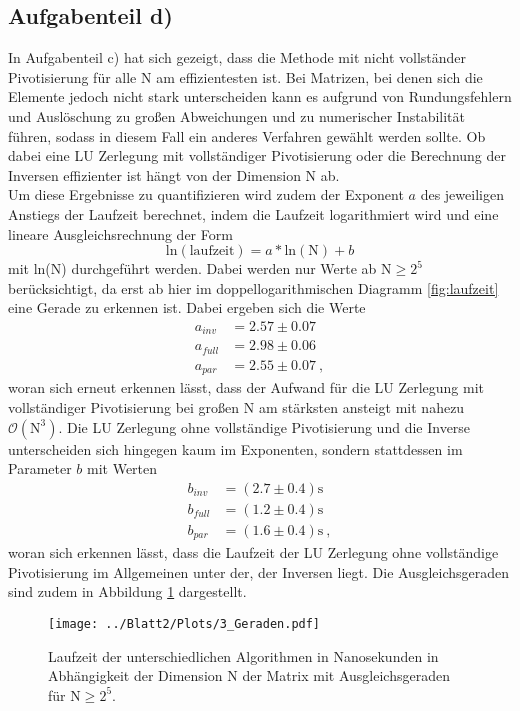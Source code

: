 \subsection*{Aufgabenteil d)}
In Aufgabenteil c) hat sich gezeigt, dass die Methode mit nicht vollständer Pivotisierung für alle N am effizientesten ist. Bei Matrizen, bei denen sich die Elemente jedoch nicht stark unterscheiden kann es aufgrund von
Rundungsfehlern und Auslöschung zu großen Abweichungen und zu numerischer Instabilität führen, sodass in diesem Fall ein anderes Verfahren gewählt werden sollte. Ob dabei eine LU Zerlegung mit vollständiger Pivotisierung oder die Berechnung der Inversen effizienter ist hängt von der Dimension N ab. \\
Um diese Ergebnisse zu quantifizieren wird zudem der Exponent $a$ des jeweiligen Anstiegs der Laufzeit berechnet, indem die Laufzeit logarithmiert wird und eine lineare Ausgleichsrechnung der Form
\begin{equation}
  \text{ln}(\text{laufzeit})=a*\text{ln}(\text{N})+b
\end{equation}
mit ln(N) durchgeführt werden. Dabei werden nur Werte ab N$\geq2^5$ berücksichtigt, da erst ab hier im doppellogarithmischen Diagramm \ref{fig:laufzeit} eine Gerade zu erkennen ist. Dabei ergeben sich die Werte
\begin{align*}
  a_{inv}&= 2.57 \pm 0.07\\
  a_{full}&= 2.98 \pm 0.06\\
  a_{par}&= 2.55 \pm 0.07 \: ,
\end{align*}
woran sich erneut erkennen lässt, dass der Aufwand für die LU Zerlegung mit vollständiger Pivotisierung
bei großen N am stärksten ansteigt mit nahezu $\mathcal{O}(\text{N}^3)$. Die LU Zerlegung ohne vollständige Pivotisierung und die Inverse unterscheiden sich hingegen kaum im Exponenten, sondern stattdessen im Parameter $b$ mit Werten
\begin{align*}
  b_{inv}&= (2.7 \pm 0.4)\text{s} \\
  b_{full}&= (1.2 \pm 0.4)\text{s} \\
  b_{par}&= (1.6 \pm 0.4)\text{s} \: ,
\end{align*}
woran sich erkennen lässt, dass die Laufzeit der LU Zerlegung ohne vollständige Pivotisierung im Allgemeinen unter der, der Inversen liegt. Die Ausgleichsgeraden sind zudem in Abbildung \ref{fig:gerade} dargestellt.
\begin{figure}[H]
  \centering
  \texttt{[image: ../Blatt2/Plots/3\_Geraden.pdf]}
  \caption{Laufzeit der unterschiedlichen Algorithmen in Nanosekunden in Abhängigkeit der Dimension N der Matrix mit Ausgleichsgeraden für N$\geq2^5$.}
  \label{fig:gerade}
\end{figure}
